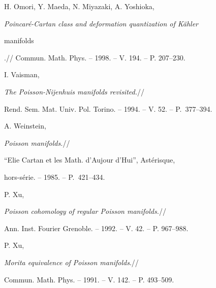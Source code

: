 

H. Omori, Y. Maeda, N. Miyazaki, A. Yoshioka,


{\it Poincar\'e-Cartan class and deformation quantization of K\"ahler


manifolds}.// Commun. Math. Phys. -- 1998. -- V. 194. -- P. 207--230.







I. Vaisman,


{\it The Poisson-Nijenhuis manifolds revisited.}//


Rend. Sem. Mat. Univ. Pol. Torino. -- 1994. -- V. 52.  -- P.~377--394.







A. Weinstein,


{\it Poisson manifolds.}//


``Elie Cartan et les Math. d'Aujour d'Hui'', Ast\'erisque,


hors-s\'erie. -- 1985. -- P.~421--434.







P. Xu,


{\it Poisson cohomology of regular Poisson manifolds.}//


Ann. Inst. Fourier Grenoble. -- 1992. -- V. 42. -- P. 967--988.







P. Xu,


{\it Morita equivalence of Poisson manifolds}.//


Commun. Math. Phys. -- 1991. -- V. 142. -- P. 493--509.













